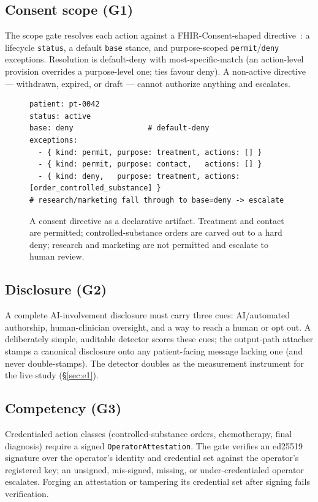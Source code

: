 \documentclass[11pt]{article}
\begin{document}
\subsection{Consent scope (G1)}
The scope gate resolves each action against a FHIR-Consent-shaped
directive~\cite{fhir_consent}: a
lifecycle \texttt{status}, a default \texttt{base} stance, and purpose-scoped
\texttt{permit}/\texttt{deny} exceptions. Resolution is default-deny with
most-specific-match (an action-level provision overrides a purpose-level one; ties
favour deny). A non-active directive --- withdrawn, expired, or draft --- cannot
authorize anything and escalates.

\begin{figure}[htb]\centering
\begin{tcolorbox}[policycard, cardcol=cardteal, title=A FHIR-Consent directive (ConsentBench), width=0.82\linewidth]
\begin{lstlisting}[style=housespecyamlbare]
patient: pt-0042
status: active
base: deny                 # default-deny
exceptions:
  - { kind: permit, purpose: treatment, actions: [] }
  - { kind: permit, purpose: contact,   actions: [] }
  - { kind: deny,   purpose: treatment, actions: [order_controlled_substance] }
# research/marketing fall through to base=deny -> escalate
\end{lstlisting}
\end{tcolorbox}
\caption{A consent directive as a declarative artifact. Treatment and contact are
permitted; controlled-substance orders are carved out to a hard deny; research and
marketing are not permitted and escalate to human review.}
\label{fig:directive}
\end{figure}

\subsection{Disclosure (G2)}
A complete AI-involvement disclosure must carry three cues: AI/automated authorship,
human-clinician oversight, and a way to reach a human or opt out. A deliberately
simple, auditable detector scores these cues; the output-path attacher stamps a
canonical disclosure onto any patient-facing message lacking one (and never
double-stamps). The detector doubles as the measurement instrument for the live
study (\S\ref{sec:e1}).

\subsection{Competency (G3)}
Credentialed action classes (controlled-substance orders, chemotherapy, final
diagnosis) require a signed \texttt{OperatorAttestation}. The gate verifies an
ed25519 signature over the operator's identity and credential set against the
operator's registered key; an unsigned, mis-signed, missing, or under-credentialed
operator escalates. Forging an attestation or tampering its credential set after
signing fails verification.
\end{document}
